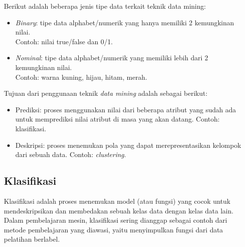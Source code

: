 \noindent Berikut adalah beberapa jenis tipe data terkait teknik data mining:

\begin{itemize}

\item \textit{Binary}: tipe data alphabet/numerik yang hanya memiliki 2 kemungkinan nilai. \\ Contoh: nilai true/false dan 0/1.

\item \textit{Nominal}: tipe data alphabet/numerik yang memiliki lebih dari 2 kemungkinan nilai.\\ Contoh: warna  kuning, hijau, hitam, merah.

\end{itemize}

\noindent Tujuan dari penggunaan teknik \textit{data mining} adalah sebagai berikut:

\begin{itemize}

\item Prediksi: proses menggunakan nilai dari beberapa atribut yang sudah ada untuk memprediksi nilai atribut di masa yang akan datang. Contoh: klasifikasi.

\item Deskripsi: proses menemukan pola yang dapat merepresentasikan kelompok dari sebuah data. Contoh: \textit{clustering}.

\end{itemize}

\subsection{Klasifikasi} 
Klasifikasi adalah proses menemukan model (atau fungsi) yang cocok untuk mendeskripsikan dan membedakan sebuah kelas data dengan kelas data lain. Dalam pembelajaran mesin, klasifikasi sering dianggap sebagai contoh dari metode pembelajaran yang diawasi, yaitu menyimpulkan fungsi dari data pelatihan berlabel.\\

